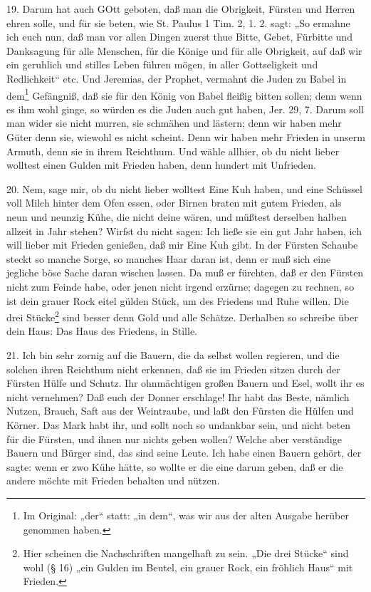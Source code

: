 19. Darum hat auch GOtt geboten, daß man die Obrigkeit, Fürsten und Herren ehren solle, und für sie beten, wie St. Paulus 1 Tim. 2, 1. 2. sagt: „So ermahne ich euch nun, daß man vor allen Dingen zuerst thue Bitte, Gebet, Fürbitte und Danksagung für alle Menschen, für die Könige und für alle Obrigkeit, auf daß wir ein geruhlich und stilles Leben führen mögen, in aller Gottseligkeit und Redlichkeit“ etc. Und Jeremias, der Prophet, vermahnt die Juden zu Babel in dem\footnote{Im Original: „der“ statt: „in dem“, was wir aus der alten Ausgabe herüber genommen haben.} Gefängniß, daß sie für den König von Babel fleißig bitten sollen; denn wenn es ihm wohl ginge, so würden es die Juden auch gut haben, Jer. 29, 7. Darum soll man wider sie nicht murren, sie schmähen und lästern; denn wir haben mehr Güter denn sie, wiewohl es nicht scheint. Denn wir haben mehr Frieden in unserm Armuth, denn sie in ihrem Reichthum. Und wähle allhier, ob du nicht lieber wolltest einen Gulden mit Frieden haben, denn hundert mit Unfrieden.

20. Nem, sage mir, ob du nicht lieber wolltest Eine Kuh haben, und eine Schüssel voll Milch hinter dem Ofen essen, oder Birnen braten mit
gutem Frieden, als neun und neunzig Kühe, die nicht deine wären, und müßtest derselben halben allzeit in Jahr stehen? Wirfst du nicht sagen: Ich ließe sie ein gut Jahr haben, ich will lieber mit Frieden genießen, daß mir Eine Kuh gibt. In der Fürsten Schaube steckt so manche Sorge, so manches Haar daran ist, denn er muß sich eine jegliche böse Sache daran wischen lassen. Da muß er fürchten, daß er den Fürsten nicht zum Feinde habe, oder jenen nicht irgend erzürne; dagegen zu rechnen, so ist dein grauer Rock eitel gülden Stück, um des Friedens und Ruhe willen. Die drei Stücke\footnote{Hier scheinen die Nachschriften mangelhaft zu sein. „Die drei Stücke“ sind wohl (§ 16) „ein Gulden im Beutel, ein grauer Rock, ein fröhlich Haus“ mit Frieden.} sind besser denn Gold und alle Schätze. Derhalben so schreibe über dein Haus: Das Haus des Friedens, in Stille.

21. Ich bin sehr zornig auf die Bauern, die da selbst wollen regieren, und die solchen ihren Reichthum nicht erkennen, daß sie im Frieden sitzen durch der Fürsten Hülfe und Schutz. Ihr ohnmächtigen großen Bauern und Esel, wollt ihr es nicht vernehmen? Daß euch der Donner erschlage! Ihr habt das Beste, nämlich Nutzen, Brauch, Saft aus der Weintraube, und laßt den Fürsten die Hülfen und Körner. Das Mark habt ihr, und sollt noch so undankbar sein, und nicht beten für die Fürsten, und ihnen nur nichts geben wollen? Welche aber verständige Bauern und Bürger sind, das sind seine Leute. Ich habe einen Bauern gehört, der sagte: wenn er zwo Kühe hätte, so wollte er die eine darum geben, daß er die andere möchte mit Frieden behalten und nützen.

